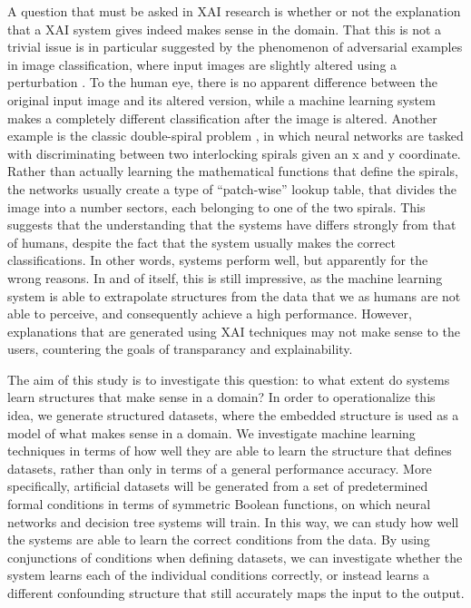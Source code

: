 \documentclass[letterpaper]{article} %
\begin{document}
A question that must be asked in XAI research is whether or not the explanation that a XAI system gives indeed makes sense in the domain. That this is not a trivial issue is in particular suggested by the phenomenon of adversarial examples in image classification, where input images are slightly altered using a perturbation \cite{yuan2017adversarial}. To the human eye, there is no apparent difference between the original input image and its altered version, while a machine learning system makes a completely different classification after the image is altered. Another example is the classic double-spiral problem \cite{Kaufmann1989Learning}, in which neural networks are tasked with discriminating between two interlocking spirals given an x and y coordinate. Rather than actually learning the mathematical functions that define the spirals, the networks usually create a type of ``patch-wise'' lookup table, that divides the image into a number sectors, each belonging to one of the two spirals. This suggests that the understanding that the systems have differs strongly from that of humans, despite the fact that the system usually makes the correct classifications. In other words, systems perform well, but apparently for the wrong reasons. In and of itself, this is still impressive, as the machine learning system is able to extrapolate structures from the data that we as humans are not able to perceive, and consequently achieve a high performance. However, explanations that are generated using XAI techniques may not make sense to the users, countering the goals of transparancy and explainability. 

The aim of this study is to investigate this question: to what extent do systems learn structures that make sense in a domain? In order to operationalize this idea, we generate structured datasets, where the embedded structure is used as a model of what makes sense in a domain. We investigate machine learning techniques in terms of how well they are able to learn the structure that defines datasets, rather than only in terms of a general performance accuracy. More specifically, artificial datasets will be generated from a set of predetermined formal conditions in terms of symmetric Boolean functions, on which neural networks and decision tree systems will train. In this way, we can study how well the systems are able to learn the correct conditions from the data. 
By using conjunctions of conditions when defining datasets, 
we can investigate whether the system learns each of the individual conditions correctly, or instead learns a different confounding structure that still accurately maps the input to the output. 
\end{document}
